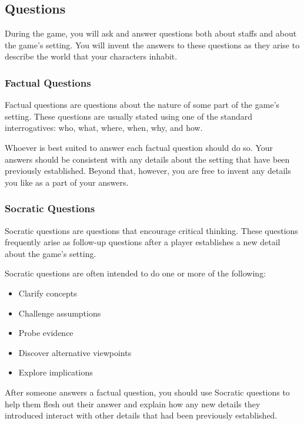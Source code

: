 \documentclass[a6paper, 11pt, parskip=half]{scrartcl}
\begin{document}
\newpage
\enlargethispage{3.5\baselineskip}

\subsection*{Questions}
During the game, you will ask and answer questions both about staffs and about the game's setting.
You will invent the answers to these questions as they arise to describe the world that your characters inhabit.

\subsubsection*{Factual Questions}

Factual questions are questions about the nature of some part of the game's setting.
These questions are usually stated using one of the standard interrogatives: who, what, where, when, why, and how.

Whoever is best suited to answer each factual question should do so.
Your answers should be consistent with any details about the setting that have been previously established.
Beyond that, however, you are free to invent any details you like as a part of your answers.

\newpage
\enlargethispage{3.5\baselineskip}

\subsubsection*{Socratic Questions}
Socratic questions are questions that encourage critical thinking.
These questions frequently arise as follow-up questions after a player establishes a new detail about the game's setting.

Socratic questions are often intended to do one or more of the following:
\begin{itemize}[nosep]
	\item Clarify concepts
	\item Challenge assumptions
	\item Probe evidence
	\item Discover alternative viewpoints
	\item Explore implications
\end{itemize}

After someone answers a factual question, you should use Socratic questions to help them flesh out their answer and explain how any new details they introduced interact with other details that had been previously established.
\end{document}
